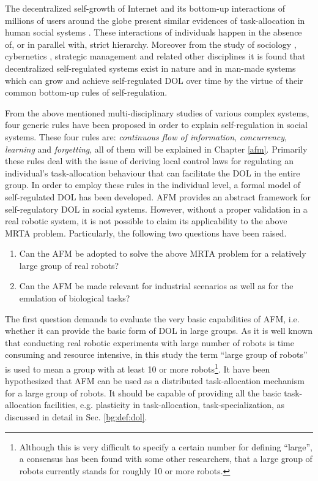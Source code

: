 The decentralized self-growth of Internet and its bottom-up interactions of millions of users around the globe present similar evidences of task-allocation in human social systems \cite{Andriani+2004}. These interactions of individuals happen in the absence of, or in parallel with, strict hierarchy. Moreover from the study of sociology \cite{Sayer+1992}, cybernetics \cite{Beer1981}, strategic management \cite{Kogut2000} and related other disciplines it is found that decentralized self-regulated systems exist in nature and in man-made systems which can grow and achieve self-regulated DOL over time by the virtue of their common bottom-up rules of self-regulation.
 
From the above mentioned multi-disciplinary studies of various complex systems, four generic rules have been proposed in order to explain self-regulation in social systems. These four rules are: \textit{continuous flow of information}, \textit{concurrency}, \textit{learning} and \textit{forgetting}, all of them will be explained in Chapter \ref{afm}. Primarily these rules deal with the issue of deriving local control laws for regulating an individual's task-allocation behaviour that can facilitate the DOL in the entire group. In order to employ these rules in the individual level, a formal model of self-regulated DOL has been developed. AFM provides an abstract framework for self-regulatory DOL in social systems. However, without a proper validation in a real robotic system, it is not possible to claim its applicability to the above MRTA problem. Particularly, the following two questions have been raised.
\begin{enumerate}
\item Can the AFM be adopted to solve the above MRTA problem for a relatively large group of real robots?
\item Can the AFM be made relevant for industrial scenarios as well as for the emulation of biological tasks?
\end{enumerate}
The first question demands to evaluate the very basic capabilities of AFM, i.e. whether it can provide the basic form of DOL in large groups. As it is well known that conducting real robotic experiments with large number of robots is time consuming and resource intensive, in this study the term ``large group of robots'' is used to mean a group with at least 10 or more robots\footnote{Although this is very difficult to specify a certain number for defining ``large'', a consensus has been found with some other researchers, \protect{} that a large group of robots currently stands for roughly 10 or more robots.}. It have been hypothesized that AFM can be used as a distributed task-allocation mechanism for a large group of robots. It should be capable of providing all the basic task-allocation facilities, e.g. plasticity in task-allocation, task-specialization, as discussed in detail in Sec. \ref{bg:def:dol}.

